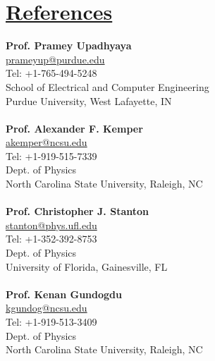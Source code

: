 \documentclass[11pt]{article}
\providecommand*\email[1]{\href{mailto:#1}{#1}}
\begin{document}
 
 \section*{\underline{References}}
 { \bf Prof. Pramey Upadhyaya} \\
 \email{prameyup@purdue.edu}\\
  Tel: +1-765-494-5248\\
 School of Electrical and Computer Engineering\\
 Purdue University, West Lafayette, IN\\
 \\
 { \bf Prof. Alexander F. Kemper} \\
 \email{akemper@ncsu.edu}\\
  Tel: +1-919-515-7339\\
 Dept. of Physics\\
 North Carolina State University, Raleigh, NC\\
 \\
 { \bf Prof. Christopher J. Stanton} \\
 \email{stanton@phys.ufl.edu}\\
  Tel: +1-352-392-8753\\
 Dept. of Physics\\
 University of Florida, Gainesville, FL\\
 \\
 { \bf Prof. Kenan Gundogdu} \\
\email{kgundog@ncsu.edu}\\
 Tel: +1-919-513-3409\\
Dept. of Physics\\
North Carolina State University, Raleigh, NC\\
\end{document}
